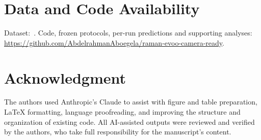 \section*{Data and Code Availability}
Dataset:~\cite{picouet2023}. Code, frozen protocols, per-run predictions and supporting analyses: \url{https://github.com/AbdelrahmanAboegela/raman-evoo-camera-ready}.

\section*{Acknowledgment}
The authors used Anthropic's Claude to assist with figure and table preparation, LaTeX formatting, language proofreading, and improving the structure and organization of existing code. All AI-assisted outputs were reviewed and verified by the authors, who take full responsibility for the manuscript's content.
